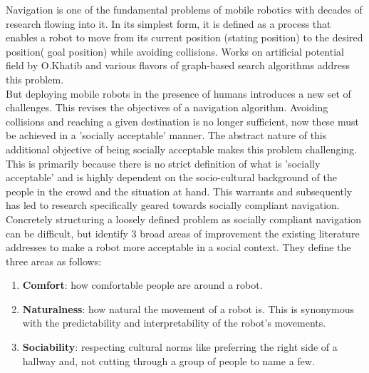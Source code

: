 

Navigation is one of the fundamental problems of mobile robotics with decades of research flowing into it. In its simplest form, it is defined as a process that enables a robot to move from its current position (stating position) to the desired position( goal position) while avoiding collisions. Works on artificial potential field by O.Khatib \cite{khatib_1986} and various flavors of graph-based search algorithms address this problem.\\

But deploying mobile robots in the presence of humans introduces a new set of challenges. This revises the objectives of a navigation algorithm. Avoiding collisions and reaching a given destination is no longer sufficient, now these must be achieved in a 'socially acceptable' manner. The abstract nature of this additional objective of being socially acceptable makes this problem challenging. This is primarily because there is no strict definition of what is 'socially acceptable' and is highly dependent on the socio-cultural background of the people in the crowd and the situation at hand. This warrants and subsequently has led to research specifically geared towards socially compliant navigation.\\

Concretely structuring a loosely defined problem as socially compliant navigation can be difficult, but \cite{kruse_human-aware_2013} identify 3 broad areas of improvement the existing literature addresses to make a robot more acceptable in a social context. They define the three areas as follows:

\begin{enumerate}
    \item \textbf{Comfort}: how comfortable people are around a robot. 
    \item \textbf{Naturalness}: how natural the movement of a robot is. This is synonymous with the predictability and interpretability of the robot's movements.
    \item \textbf{Sociability}: respecting cultural norms like preferring the right side of a hallway and, not cutting through a group of people to name a few. %
\end{enumerate}

